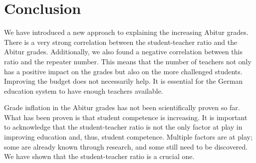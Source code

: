 \section{Conclusion}
We have introduced a new approach to explaining the increasing Abitur grades. There is a very strong correlation between the student-teacher ratio and the Abitur grades. Additionally, we also found a negative correlation between this ratio and the repeater number. This means that the number of teachers not only has a positive impact on the grades but also on the more challenged students. Improving the budget does not necessarily help. It is essential for the German education system to have enough teachers available.

Grade inflation in the Abitur grades has not been scientifically proven so far. What has been proven is that student competence is increasing. It is important to acknowledge that the student-teacher ratio is not the only factor at play in improving education and, thus, student competence. Multiple factors are at play; some are already known through research, and some still need to be discovered. We have shown that the student-teacher ratio is a crucial one.
